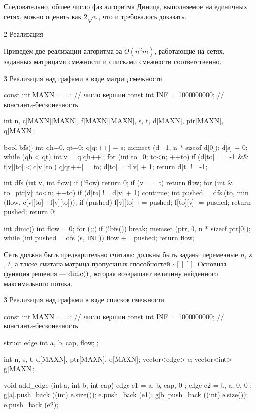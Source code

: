 Следовательно, общее число фаз алгоритма Диница, выполняемое на единичных сетях, можно оценить как $2 \sqrt{n}$, что и требовалось доказать.



\h2{ Реализация }

Приведём две реализации алгоритма за $O (n^2 m)$, работающие на сетях, заданных матрицами смежности и списками смежности соответственно.


\h3{ Реализация над графами в виде матриц смежности }

\code
const int MAXN = ...; // число вершин
const int INF = 1000000000; // константа-бесконечность

int n, c[MAXN][MAXN], f[MAXN][MAXN], s, t, d[MAXN], ptr[MAXN], q[MAXN];

bool bfs() {
	int qh=0, qt=0;
	q[qt++] = s;
	memset (d, -1, n * sizeof d[0]);
	d[s] = 0;
	while (qh < qt) {
		int v = q[qh++];
		for (int to=0; to<n; ++to)
			if (d[to] == -1 && f[v][to] < c[v][to]) {
				q[qt++] = to;
				d[to] = d[v] + 1;
			}
	}
	return d[t] != -1;
}

int dfs (int v, int flow) {
	if (!flow)  return 0;
	if (v == t)  return flow;
	for (int & to=ptr[v]; to<n; ++to) {
		if (d[to] != d[v] + 1)  continue;
		int pushed = dfs (to, min (flow, c[v][to] - f[v][to]));
		if (pushed) {
			f[v][to] += pushed;
			f[to][v] -= pushed;
			return pushed;
		}
	}
	return 0;
}

int dinic() {
	int flow = 0;
	for (;;) {
		if (!bfs())  break;
		memset (ptr, 0, n * sizeof ptr[0]);
		while (int pushed = dfs (s, INF))
			flow += pushed;
	}
	return flow;
}
\endcode

Сеть должна быть предварительно считана: должны быть заданы переменные $n$, $s$, $t$, а также считана матрица пропускных способностей $c[][]$. Основная функция решения --- $\rm dinic()$, которая возвращает величину найденного максимального потока.


\h3{ Реализация над графами в виде списков смежности }

\code
const int MAXN = ...; // число вершин
const int INF = 1000000000; // константа-бесконечность

struct edge {
	int a, b, cap, flow;
};

int n, s, t, d[MAXN], ptr[MAXN], q[MAXN];
vector<edge> e;
vector<int> g[MAXN];

void add_edge (int a, int b, int cap) {
	edge e1 = { a, b, cap, 0 };
	edge e2 = { b, a, 0, 0 };
	g[a].push_back ((int) e.size());
	e.push_back (e1);
	g[b].push_back ((int) e.size());
	e.push_back (e2);
}

